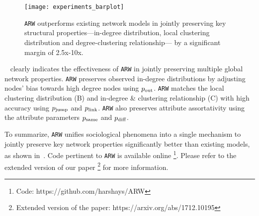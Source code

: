 \begin{figure}
	\centering
	\texttt{[image: experiments\_barplot]}
		\caption{\texttt{ARW} outperforms
			existing network models in jointly preserving key structural properties---in-degree
			distribution, local clustering distribution and degree-clustering relationship---
			by a significant margin of 2.5x-10x.
		}
		\label{fig:barplot}
		\vspace{-10pt}
\end{figure}

~ clearly indicates the effectiveness
of \texttt{ARW} in {jointly} preserving multiple
global network properties. \texttt{ARW} preserves observed
in-degree distributions by adjusting nodes' bias towards high degree nodes
using $p_{\scriptsize\mbox{out}}$.
\texttt{ARW} matches the local clustering
distribution  (B) and in-degree \& clustering relationship
(C) with high accuracy using $p_{\scriptsize\mbox{jump}}$ and
$p_{\scriptsize\mbox{link}}$. \texttt{ARW} also preserves attribute assortativity using
the attribute parameters $p_{\scriptsize\mbox{same}}$ and $p_{\scriptsize\mbox{diff}}$.

To summarize, \texttt{ARW} unifies sociological phenomena into a single
mechanism to jointly preserve key network properties significantly
better than existing models, as shown in~.
Code pertinent to \texttt{ARW} is available online \footnote{Code: https://github.com/harshays/ARW}.
Please refer to the extended version of
our paper \footnote{Extended version of the paper: https://arxiv.org/abs/1712.10195} for
more information.





